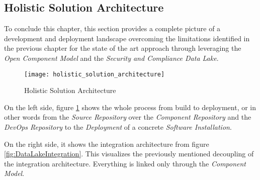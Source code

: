 \subsection{Holistic Solution Architecture}
To conclude this chapter, this section provides a complete picture of a development and deployment landscape overcoming the limitations identified in the previous chapter for the state of the art approach through leveraging the \emph{Open Component Model} and the \emph{Security and Compliance Data Lake}.

\begin{figure}[H]
	\centering
	\texttt{[image: holistic\_solution\_architecture]}
	\caption[Holistic Solution Architecture]{Holistic Solution Architecture }
	\label{fig:HolisticSolutionArchitecture}
\end{figure}

On the left side, figure \ref{fig:HolisticSolutionArchitecture} shows the whole process from build to deployment, or in other words from the \emph{Source Repository} over the \emph{Component Repository} and the \emph{DevOps Repository} to the \emph{Deployment} of a concrete \emph{Software Installation}.\par
On the right side, it shows the integration architecture from figure \ref{fig:DataLakeIntegration}. This visualizes the previously mentioned decoupling of the integration architecture. Everything is linked only through the \emph{Component Model}.\\

